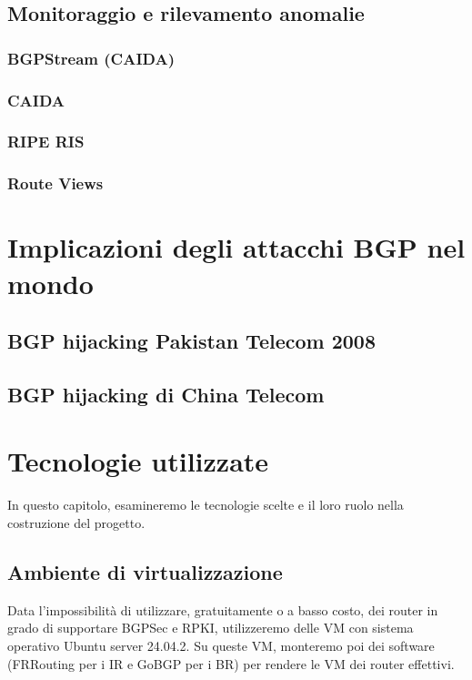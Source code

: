 \documentclass[12pt,a4paper,twoside]{book}
\begin{document}
\section{Monitoraggio e rilevamento anomalie}

\subsection{BGPStream (CAIDA)}

\subsection{CAIDA}

\subsection{RIPE RIS}

\subsection{Route Views}

\chapter{Implicazioni degli attacchi BGP nel mondo}

\section{BGP hijacking Pakistan Telecom 2008}

\section{BGP hijacking di China Telecom}

\chapter{Tecnologie utilizzate}
In questo capitolo, esamineremo le tecnologie scelte e il loro ruolo nella costruzione del progetto.

\section{Ambiente di virtualizzazione}
Data l'impossibilità di utilizzare, gratuitamente o a basso costo, dei router in grado di supportare \ac{BGPSec} e \ac{RPKI}, utilizzeremo delle \ac{VM} con sistema operativo Ubuntu server 24.04.2. Su queste \ac{VM}, monteremo poi dei software (FRRouting per i \ac{IR} e GoBGP per i \ac{BR}) per rendere le \ac{VM} dei router effettivi.
\end{document}
